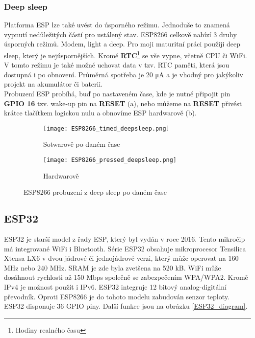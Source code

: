 \documentclass[a4paper, 12pt]{report}
\begin{document}
					\subsubsection{Deep sleep} \label{subsub:Deep sleep}
						Platforma ESP lze také uvést do úsporného režimu. Jednoduše to znamená vypnutí nedůležitých částí pro ustálený stav. ESP8266 celkově nabízí 3 druhy úsporných režimů. Modem, light a deep. Pro moji maturitní práci použiji deep sleep, který je nejúspornějších. Kromě {\bf RTC}\footnote{Hodiny realného času} se vše vypne, včetně CPU či WiFi. V tomto režimu je také možné uchovat data v tzv. RTC paměti, která jsou dostupná i po obnovení. Průměrná spotřeba je 20 \si{\micro A} a je vhodný pro jakýkoliv projekt na akumulátor či baterii. \\
						Probuzení ESP probíhá, buď po nastaveném čase, kde je nutné připojit pin {\bf GPIO 16} tzv. wake-up pin na {\bf RESET} (a), nebo můžeme na {\bf RESET} přivést krátce tlačítkem logickou nulu a obnovíme ESP hardwarově (b).

						\begin{figure}[h!]
						  \centering
						  \begin{subfigure}[b]{0.4\linewidth}
						    \texttt{[image: ESP8266\_timed\_deepsleep.png]}
						    \caption{Sotwarově po daném čase}
						  \end{subfigure}
						  \begin{subfigure}[b]{0.4\linewidth}
						    \texttt{[image: ESP8266\_pressed\_deepsleep.png]}
						    \caption{Hardwarově}
						  \end{subfigure}
						  \caption{ESP8266 probuzení z deep sleep po daném čase}
						  \label{ESP8266_timed_pressed_deepsleep}
						\end{figure}


			\subsection{ESP32}
				ESP32 je starší model z řady ESP, který byl vydán v roce 2016. Tento mikročip má integrované WiFi i Bluetooth. Série ESP32 obsahuje mikroprocesor Tensilica Xtensa LX6 v dvou jádrové či jednojádrové verzi, který může operovat na 160 \si{MHz} nebo 240 \si{MHz}. SRAM je zde byla zvetšena na 520 \si{kB}. WiFi může dosáhnout rychlosti až 150 \si{Mbps} společně se zabezpečením WPA/WPA2. Kromě IPv4 je možnost použít i IPv6. ESP32 integruje 12 bitový analog-digitální převodník. Oproti ESP8266 je do tohoto modelu zabudován senzor teploty. ESP32 disponuje 36 GPIO piny. Další funkce jsou na obrázku \ref{ESP32_diagram}.
\end{document}
